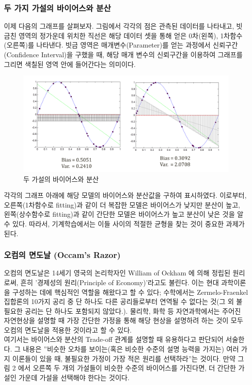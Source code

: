 \documentclass[a4paper]{oblivoir}
\begin{document}
\subsubsection{두 가지 가설의 바이어스와 분산}
이제 다음의 그래프를 살펴보자. 그림에서 각각의 점은 관측된 데이터를 나타내고, 빗금친 영역의 정가운데 위치한 직선은 해당 데이터 셋을 통해 얻은 0차(왼쪽), 1차함수(오른쪽)를 나타낸다. 빗금 영역은 매개변수(Parameter)를 얻는 과정에서 신뢰구간(Confidence Interval)을 구했을 때, 해당 매개 변수의 신뢰구간을 이용하여 그래프를 그리면 색칠된 영역 안에 들어간다는 의미이다. 
\begin{figure}[ht]
\centering
\includegraphics[scale=0.5]{BV_Tradeoff3.png}
\caption{두 가설의 바이어스와 분산}
\label{Figure 6-5}
\end{figure}

\indent 각각의 그래프 아래에 해당 모델의 바이어스와 분산값을 구하여 표시하였다. 이로부터, 오른쪽(1차함수로 fitting)과 같이 더 복잡한 모델은 바이어스가 낮지만 분산이 높고, 왼쪽(상수함수로 fitting)과 같이 간단한 모델은 바이어스가 높고 분산이 낮은 것을 알 수 있다. 따라서, 기계학습에서는 이들 사이의 적절한 균형을 찾는 것이 중요한 과제가 된다.

\subsubsection{오컴의 면도날 (Occam's Razor)}
오컴의 면도날은 14세기 영국의 논리학자인 William of Ockham 에 의해 정립된 원리로써, 흔히 '경제성의 원리(Principle of Economy)'라고도 불린다. 이는 현대 과학이론을 구성하는 데에 핵심적인 역할을 해왔다고 할 수 있다; 수학에서는 Zermelo-Fraenkel 집합론의 10가지 공리 중 단 하나도 다른 공리들로부터 연역될 수 없다는  것(그 외 불필요한 공리는 단 하나도 포함되지 않았다.). 물리학, 화학 등 자연과학에서는 주어진 자연현상을 설명할 때 가장 간단한 가정을 통해 해당 현상을 설명하려 하는 것이 모두 오컴의 면도날을 적용한 것이라고 할 수 있다. \\
\indent 여기서는 바이어스와 분산의 Trade-off 관계를 설명할 때 유용하다고 판단되어 서술한다. 그 내용은 ''비슷한 오차를 보이는(혹은 비슷한 수준의 설명 능력을 가지는) 여러 가지 이론들이 있을 때, 불필요한 가정이 가장 적은 원리를 선택하라''는 것이다. 만약 그림 2 에서 오른쪽 두 개의 가설들이 비슷한 수준의 바이어스를 가진다면, 더 간단한 가설인 가운데 가설을 선택해야 한다는 것이다.
\end{document}
